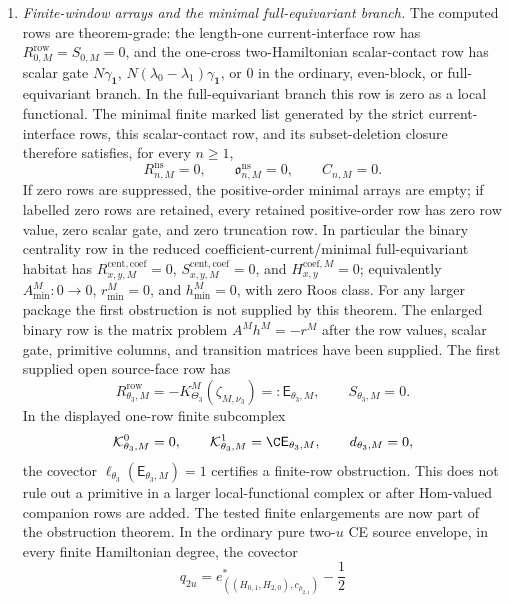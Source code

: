 \begin{stmt}
\begin{enumerate}[label=(\arabic*)]
    \item \emph{Finite-window arrays and the minimal full-equivariant
    branch.}  The computed rows are theorem-grade: the length-one
    current-interface row has \(R^{\mathrm{row}}_{0,M}=S_{0,M}=0\), and
    the one-cross two-Hamiltonian scalar-contact row has scalar gate
    \(N\gamma_{\mathbf 1}\), \(N(\lambda_0-\lambda_1)\gamma_{\mathbf 1}\),
    or \(0\) in the ordinary, even-block, or full-equivariant branch.  In
    the full-equivariant branch this row is zero as a local functional.
    The minimal finite marked list generated by the strict
    current-interface rows, this scalar-contact row, and its
    subset-deletion closure therefore satisfies, for every \(n\geq1\),
    \[
      R^{\mathrm{ns}}_{n,M}=0,\qquad
      \mathfrak o^{\mathrm{ns}}_{n,M}=0,\qquad
      C_{n,M}=0 .
    \]
    If zero rows are suppressed, the positive-order minimal arrays are
    empty; if labelled zero rows are retained, every retained
    positive-order row has zero row value, zero scalar gate, and zero
    truncation row.  In particular the binary centrality row in the
    reduced coefficient-current/minimal full-equivariant habitat has
    \(R^{\mathrm{cent},\mathrm{coef}}_{x,y,M}=0\),
    \(S^{\mathrm{cent},\mathrm{coef}}_{x,y,M}=0\), and
    \(H^{\mathrm{coef},M}_{x,y}=0\); equivalently
    \(A^M_{\min}:0\to0\), \(r^M_{\min}=0\), and \(h^M_{\min}=0\), with
    zero Roos class.  For any larger package the first obstruction is not
    supplied by this theorem.  The enlarged binary row is the matrix
    problem \(A^Mh^M=-r^M\) after the row values, scalar gate, primitive
    columns, and transition matrices have been supplied.  The first
    supplied open source-face row has
    \[
      R^{\mathrm{row}}_{\theta_3,M}
      =
      -K^M_{\Theta_3}(\zeta_{M,\nu_3})
      =:\mathsf E_{\theta_3,M},
      \qquad
      S_{\theta_3,M}=0 .
    \]
    In the displayed one-row finite subcomplex
    \[
      \mathcal K^0_{\theta_3,M}=0,\qquad
      \mathcal K^1_{\theta_3,M}=\C\mathsf E_{\theta_3,M},
      \qquad
      d_{\theta_3,M}=0,
    \]
    the covector
    \(\ell_{\theta_3}(\mathsf E_{\theta_3,M})=1\) certifies a finite-row
    obstruction.  This does not rule out a primitive in a larger
    local-functional complex or after Hom-valued companion rows are added.
    The tested finite enlargements are now part of the obstruction
    theorem.  In the ordinary pure two-\(u\) CE source envelope, in every
    finite Hamiltonian degree, the covector
    \[
      q_{2u}
      =
      e^*_{((H_{0,1},H_{2,0}),c_{\rho_{2,1}})}
      -\frac12
\]
\end{enumerate}
\end{stmt}
